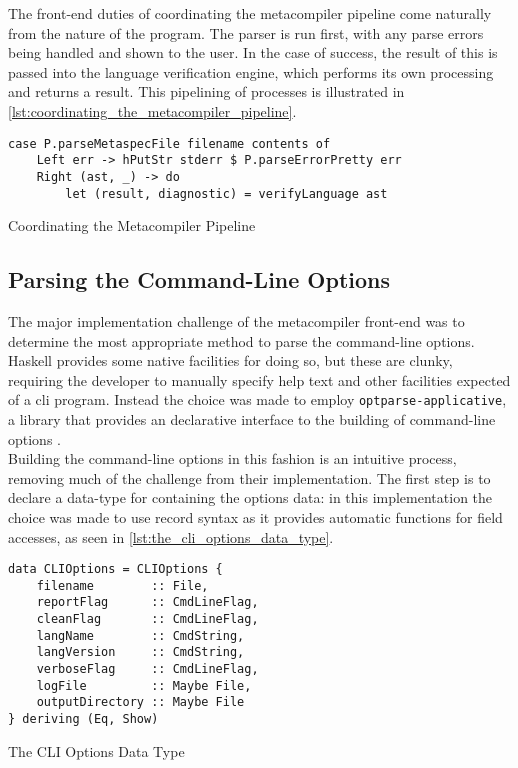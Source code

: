 The front-end duties of coordinating the metacompiler pipeline come naturally from the nature of the program.
The parser is run first, with any parse errors being handled and shown to the user.
In the case of success, the result of this is passed into the language verification engine, which performs its own processing and returns a result.
This pipelining of processes is illustrated in \autoref{lst:coordinating_the_metacompiler_pipeline}.

\begin{listing}[!htb]
\begin{verbatim}
case P.parseMetaspecFile filename contents of
    Left err -> hPutStr stderr $ P.parseErrorPretty err
    Right (ast, _) -> do
        let (result, diagnostic) = verifyLanguage ast
\end{verbatim}
\caption{Coordinating the Metacompiler Pipeline}
\label{lst:coordinating_the_metacompiler_pipeline}
\end{listing}

\subsection{Parsing the Command-Line Options} %
\label{sub:parsing_the_command_line_options}
The major implementation challenge of the metacompiler front-end was to determine the most appropriate method to parse the command-line options.
Haskell provides some native facilities for doing so, but these are clunky, requiring the developer to manually specify help text and other facilities expected of a \gls{cli} program.
Instead the choice was made to employ \texttt{optparse-applicative}, a library that provides an declarative interface to the building of command-line options \citep{optparse_applicative}.\\

Building the command-line options in this fashion is an intuitive process, removing much of the challenge from their implementation. 
The first step is to declare a data-type for containing the options data: in this implementation the choice was made to use record syntax as it provides automatic functions for field accesses, as seen in \autoref{lst:the_cli_options_data_type}.

\begin{listing}[!htb]
\begin{verbatim}
data CLIOptions = CLIOptions {
    filename        :: File,
    reportFlag      :: CmdLineFlag,
    cleanFlag       :: CmdLineFlag,
    langName        :: CmdString,
    langVersion     :: CmdString,
    verboseFlag     :: CmdLineFlag,
    logFile         :: Maybe File,
    outputDirectory :: Maybe File
} deriving (Eq, Show)
\end{verbatim}
\caption{The CLI Options Data Type}
\label{lst:the_cli_options_data_type}
\end{listing}

